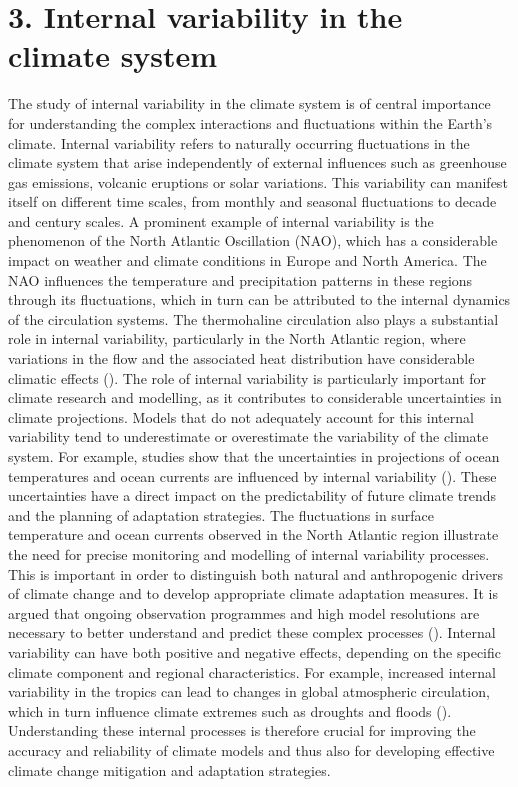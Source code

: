 \documentclass[
]{krantz}
\begin{document}
\section{3. Internal variability in the climate system}\label{internal-variability-in-the-climate-system}

The study of internal variability in the climate system is of central importance for understanding the complex interactions and fluctuations within the Earth's climate. Internal variability refers to naturally occurring fluctuations in the climate system that arise independently of external influences such as greenhouse gas emissions, volcanic eruptions or solar variations. This variability can manifest itself on different time scales, from monthly and seasonal fluctuations to decade and century scales.
A prominent example of internal variability is the phenomenon of the North Atlantic Oscillation (NAO), which has a considerable impact on weather and climate conditions in Europe and North America. The NAO influences the temperature and precipitation patterns in these regions through its fluctuations, which in turn can be attributed to the internal dynamics of the circulation systems. The thermohaline circulation also plays a substantial role in internal variability, particularly in the North Atlantic region, where variations in the flow and the associated heat distribution have considerable climatic effects (\citet{latif2022natural}).
The role of internal variability is particularly important for climate research and modelling, as it contributes to considerable uncertainties in climate projections. Models that do not adequately account for this internal variability tend to underestimate or overestimate the variability of the climate system. For example, studies show that the uncertainties in projections of ocean temperatures and ocean currents are influenced by internal variability (\citet{deser}). These uncertainties have a direct impact on the predictability of future climate trends and the planning of adaptation strategies.
The fluctuations in surface temperature and ocean currents observed in the North Atlantic region illustrate the need for precise monitoring and modelling of internal variability processes. This is important in order to distinguish both natural and anthropogenic drivers of climate change and to develop appropriate climate adaptation measures. It is argued that ongoing observation programmes and high model resolutions are necessary to better understand and predict these complex processes (\citet{latif2022natural}).
Internal variability can have both positive and negative effects, depending on the specific climate component and regional characteristics. For example, increased internal variability in the tropics can lead to changes in global atmospheric circulation, which in turn influence climate extremes such as droughts and floods (\citet{deser}).
Understanding these internal processes is therefore crucial for improving the accuracy and reliability of climate models and thus also for developing effective climate change mitigation and adaptation strategies.
\end{document}
